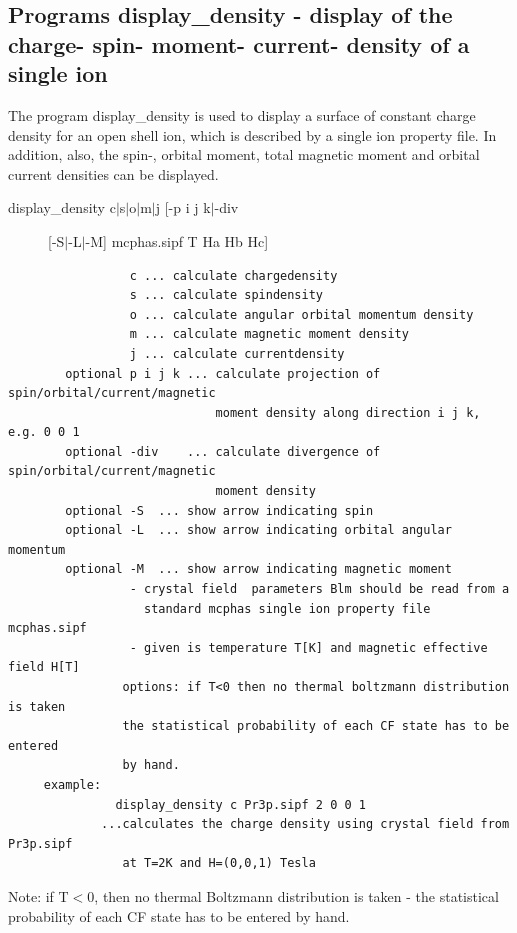 \subsection{Programs {\prg display\_density} 
- display of the charge- spin- moment- current- density of a single ion}\label{displaydensity}

The program {\prg display\_density} is used to display a surface of constant
charge density for an open shell ion, which is described by a single ion property file.
In addition, also, the spin-, orbital moment, total magnetic moment and orbital current
densities can be displayed. 


\begin{description} 
\item [ display\_density  c$|$s$|$o$|$m$|$j [-p i j k$|$-div] [-S$|$-L$|$-M] mcphas.sipf
 T Ha Hb Hc]
\end{description} 
\begin{verbatim}
                 c ... calculate chargedensity
                 s ... calculate spindensity
                 o ... calculate angular orbital momentum density
                 m ... calculate magnetic moment density
                 j ... calculate currentdensity
        optional p i j k ... calculate projection of spin/orbital/current/magnetic 
                             moment density along direction i j k, e.g. 0 0 1
        optional -div    ... calculate divergence of spin/orbital/current/magnetic 
                             moment density
        optional -S  ... show arrow indicating spin
        optional -L  ... show arrow indicating orbital angular momentum
        optional -M  ... show arrow indicating magnetic moment
                 - crystal field  parameters Blm should be read from a
                   standard mcphas single ion property file mcphas.sipf
                 - given is temperature T[K] and magnetic effective field H[T]
                options: if T<0 then no thermal boltzmann distribution is taken
                the statistical probability of each CF state has to be entered
                by hand.
     example:
               display_density c Pr3p.sipf 2 0 0 1
             ...calculates the charge density using crystal field from Pr3p.sipf
                at T=2K and H=(0,0,1) Tesla
\end{verbatim}

Note: if T$<$0, then no thermal Boltzmann distribution is taken - 
		the statistical probability of each CF state has to be 
		entered by hand.


